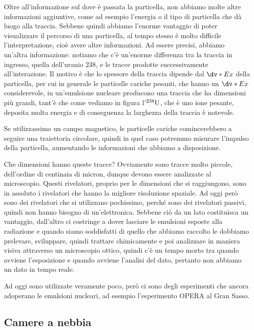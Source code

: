 Oltre all'informazione sul dove è passata la particella, non abbiamo molte altre informazioni aggiuntive, come ad esempio l'energia o il tipo di particella che dà luogo alla traccia. Sebbene quindi abbiamo l'enorme vantaggio di poter visualizzare il percorso di una particella, al tempo stesso è molto difficile l'interpretazione, cioè avere altre informazioni. Ad essere precisi, abbiamo un'altra informazione: notiamo che c'è un'enorme differenza tra la traccia in ingresso, quella dell'uranio 238, e le tracce prodotte successivamente all'interazione. Il motivo è che lo spessore della traccia dipende dal $\dv*{E}{x}$ della particella, per cui in generale le particelle cariche pesanti, che hanno un $\dv*{E}{x}$ considerevole, in un'emulsione nucleare producono una traccia che ha dimensioni più grandi, tant'è che come vediamo in figura l'$\rm ^{238}U$, che è uno ione pesante, deposita molta energia e di conseguenza la larghezza della traccia è notevole.

Se utilizzassimo un campo magnetico, le particelle cariche comincerebbero a seguire una traiettoria circolare, quindi in quel caso potremmo misurare l'impulso della particella, aumentando le informazioni che abbiamo a disposizione.

Che dimensioni hanno queste tracce? Ovviamente sono tracce molto piccole, dell'ordine di centinaia di micron, dunque devono essere analizzate al microscopio. Questi rivelatori, proprio per le dimensioni che si raggiungono, sono in assoluto i rivelatori che hanno la migliore risoluzione spaziale. Ad oggi però sono dei rivelatori che si utilizzano pochissimo, perché sono dei rivelatori passivi, quindi non hanno bisogno di un'elettronica. Sebbene ciò da un lato costituisca un vantaggio, dall'altro ci costringe a dover lasciare le emulsioni esposte alla radiazione e quando siamo soddisfatti di quello che abbiamo raccolto le dobbiamo prelevare, sviluppare, quindi trattare chimicamente e poi analizzare in maniera visiva attraverso un microscopio ottico, quindi c'è un tempo morto tra quando avviene l'esposizione e quando avviene l'analisi del dato, pertanto non abbiamo un dato in tempo reale.

Ad oggi sono utilizzate veramente poco, però ci sono degli esperimenti che ancora adoperano le emulsioni nucleari, ad esempio l'esperimento OPERA al Gran Sasso.

\subsection{Camere a nebbia}

